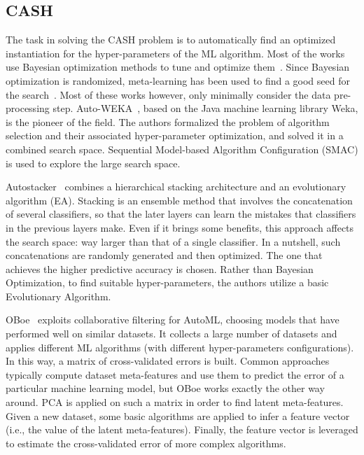 \subsection{CASH} The task in solving the CASH problem is to automatically find an optimized instantiation for the hyper-parameters of the ML algorithm. Most of the works use Bayesian optimization methods to tune and optimize them~\cite{Feurer15AutoSklearn,Thornton13AutoWeka,Olson16Tpot}. Since Bayesian optimization is randomized, meta-learning has been used to find a good seed for the search~\cite{Feurer15AAAI}. Most of these works however, only minimally consider the data pre-processing step.
Auto-WEKA~\cite{Thornton13AutoWeka}, based on the Java machine learning library Weka, is the pioneer of the field.
The authors formalized the problem of algorithm selection and their associated hyper-parameter optimization, and solved it in a combined search space. 
Sequential Model-based Algorithm Configuration (SMAC) is used to explore the large search space.

Autostacker~\cite{chen2018autostacker} combines a hierarchical stacking architecture and an evolutionary algorithm (EA).
Stacking is an ensemble method that involves the concatenation of several classifiers, so that the later layers can learn the mistakes that classifiers in the previous layers make.
Even if it brings some benefits, this approach affects the search space: way larger than that of a single classifier.
In a nutshell, such concatenations are randomly generated and then optimized.
The one that achieves the higher predictive accuracy is chosen.
Rather than Bayesian Optimization, to find suitable hyper-parameters, the authors utilize a basic Evolutionary Algorithm.

OBoe~\cite{yang2019oboe} exploits collaborative filtering for AutoML, choosing models that have performed well on similar datasets.
It collects a large number of datasets and applies different ML algorithms (with different hyper-parameters configurations). 
In this way, a matrix of cross-validated errors is built.
Common approaches typically compute dataset meta-features and use them to predict the error of a particular machine learning model, but OBoe works exactly the other way around.
PCA is applied on such a matrix in order to find latent meta-features.
Given a new dataset, some basic algorithms are applied to infer a feature vector (i.e., the value of the latent meta-features).
Finally, the feature vector is leveraged to estimate the cross-validated error of more complex algorithms.

